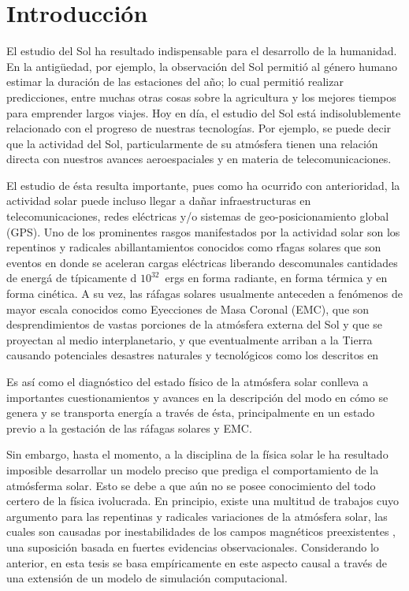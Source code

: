 \chapter{Introducci\'on}


El estudio del Sol ha resultado indispensable para el desarrollo de la humanidad. En la antig\"uedad, por ejemplo, la observaci\'on del Sol permiti\'o al g\'enero humano estimar la duraci\'on de las estaciones del a\~no; lo cual permiti\'o realizar predicciones, entre muchas otras cosas sobre la agricultura y los mejores tiempos para emprender largos viajes. Hoy en d\'ia, el estudio del Sol est\'a indisolublemente relacionado con el progreso de nuestras tecnolog\'ias. Por ejemplo, se puede decir que la actividad del Sol, particularmente de su atm\'osfera tienen una relaci\'on directa con nuestros avances aeroespaciales y en materia de telecomunicaciones.

El estudio de \'esta resulta importante, pues como ha ocurri\'do con anterioridad, la actividad solar puede incluso llegar a da\~nar infraestructuras en telecomunicaciones, redes el\'ectricas y/o sistemas de geo-posicionamiento global (GPS)\citep{carrington}. Uno de los prominentes rasgos manifestados por la actividad solar son los repentinos y radicales abillantamientos conocidos como r\'fagas solares que son eventos en donde se aceleran cargas el\'ectricas liberando descomunales cantidades de energ\'a de t\'ipicamente d $10^{32}$~ergs en forma radiante, en forma t\'ermica y en forma cin\'etica. A su vez, las r\'afagas solares usualmente anteceden a fen\'omenos de mayor escala conocidos como Eyecciones de Masa Coronal (EMC), que son desprendimientos de vastas porciones de la atm\'osfera externa del Sol y que se proyectan al medio interplanetario, y que eventualmente arriban a la Tierra causando potenciales desastres naturales y tecnol\'ogicos como los descritos en~\citep{carrington}

Es as\'i como el diagn\'ostico del estado f\'isico de la atm\'osfera solar conlleva a importantes cuestionamientos y avances en la descripci\'on del modo en c\'omo se genera y se transporta energ\'ia a trav\'es de \'esta, principalmente en un estado previo a la gestaci\'on de las r\'afagas solares y EMC.

Sin embargo, hasta el momento, a la disciplina de la f\'isica solar le ha resultado imposible desarrollar un modelo preciso que prediga el comportamiento de la atm\'osferma solar. Esto se debe a que a\'un no se posee conocimiento del todo certero de la f\'isica ivolucrada. En principio, existe una multitud de trabajos cuyo argumento para las repentinas y radicales variaciones de la atm\'osfera solar, las cuales son causadas por inestabilidades de los campos magn\'eticos preexistentes \citep{chromotemp}, una suposici\'on basada en fuertes evidencias observacionales. Considerando lo anterior, en esta tesis se basa emp\'iricamente en este aspecto causal a trav\'es de una extensi\'on de un modelo de simulaci\'on computacional.

